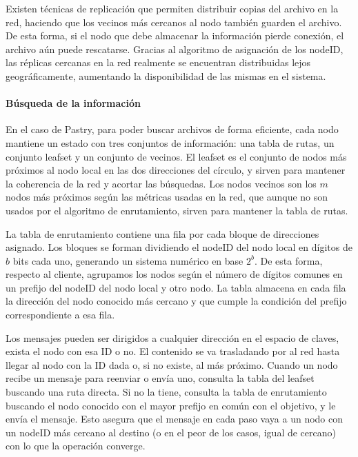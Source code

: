 Existen técnicas de replicación que permiten distribuir copias del archivo en
la red, haciendo que los vecinos más cercanos al nodo también guarden el
archivo. De esta forma, si el nodo que debe almacenar la información pierde
conexión, el archivo aún puede rescatarse. Gracias al algoritmo de
asignación de los nodeID, las réplicas cercanas en la red realmente se
encuentran distribuidas lejos geográficamente, aumentando la disponibilidad de
las mismas en el sistema.


\paragraph{Búsqueda de la información}

 En el caso de Pastry, para poder buscar archivos de forma eficiente, cada nodo mantiene un
estado con tres conjuntos de información: una tabla de rutas, un conjunto
leafset y un conjunto de vecinos.
El leafset es el conjunto de nodos más próximos al nodo local en las dos
direcciones del círculo, y sirven para mantener la coherencia de la red y acortar las
búsquedas. Los nodos vecinos son los $m$ nodos más próximos según las
métricas usadas en la red, que aunque no son usados por el algoritmo de
enrutamiento, sirven para mantener la tabla de rutas.

La tabla de enrutamiento contiene una fila por cada bloque de direcciones
asignado. Los bloques se forman dividiendo el nodeID del nodo local en dígitos
de $b$ bits cada uno, generando un sistema numérico en base $2^b$. De esta forma, respecto al cliente,
agrupamos los nodos según el número de dígitos comunes en un prefijo del nodeID
del nodo local y otro nodo. La tabla almacena en cada fila la dirección del nodo conocido más
cercano y que cumple la condición del prefijo correspondiente a esa fila.

Los mensajes pueden ser dirigidos a cualquier dirección en el espacio de
claves, exista el nodo con esa ID o no. El contenido se va trasladando por al red hasta llegar al
nodo con la ID dada o, si no existe, al más próximo. Cuando un nodo recibe un mensaje para
reenviar o envía uno, consulta la tabla del leafset buscando una ruta directa. Si no la
tiene, consulta la tabla de enrutamiento buscando el nodo conocido con el mayor prefijo en
común con el objetivo, y le envía el mensaje. Esto asegura que el mensaje en cada paso vaya
a un nodo con un nodeID más cercano al destino (o en el peor de los casos, igual de cercano)
con lo que la operación converge.

